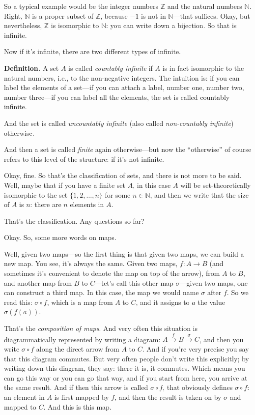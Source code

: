 So a typical example would be the integer numbers $\mathbb{Z}$ and the natural numbers $\mathbb{N}$. Right, $\mathbb{N}$ is a proper subset of $\mathbb{Z}$, because $-1$ is not in $\mathbb{N}$---that suffices. Okay, but nevertheless, $\mathbb{Z}$ is isomorphic to $\mathbb{N}$: you can write down a bijection. So that is infinite.

Now if it's infinite, there are two different types of infinite.

\textbf{Definition.} A set $A$ is called \emph{countably infinite} if $A$ is in fact isomorphic to the natural numbers, i.e., to the non-negative integers. The intuition is: if you can label the elements of a set---if you can attach a label, number one, number two, number three---if you can label all the elements, the set is called countably infinite.

And the set is called \emph{uncountably infinite} (also called \emph{non-countably infinite}) otherwise.

And then a set is called \emph{finite} again otherwise---but now the ``otherwise'' of course refers to this level of the structure: if it's not infinite.

Okay, fine. So that's the classification of sets, and there is not more to be said. Well, maybe that if you have a finite set $A$, in this case $A$ will be set-theoretically isomorphic to the set $\{1, 2, \ldots, n\}$ for some $n \in \mathbb{N}$, and then we write that the size of $A$ is $n$: there are $n$ elements in $A$.

That's the classification. Any questions so far?

Okay. So, some more words on maps.

Well, given two maps---so the first thing is that given two maps, we can build a new map. You see, it's always the same. Given two maps, $f : A \to B$ (and sometimes it's convenient to denote the map on top of the arrow), from $A$ to $B$, and another map from $B$ to $C$---let's call this other map $\sigma$---given two maps, one can construct a third map. In this case, the map we would name $\sigma$ after $f$. So we read this: $\sigma \circ f$, which is a map from $A$ to $C$, and it assigns to $a$ the value $\sigma(f(a))$.

That's the \emph{composition of maps}. And very often this situation is diagrammatically represented by writing a diagram: $A \xrightarrow{f} B \xrightarrow{\sigma} C$, and then you write $\sigma \circ f$ along the direct arrow from $A$ to $C$. And if you're very precise you say that this diagram commutes. But very often people don't write this explicitly; by writing down this diagram, they say: there it is, it commutes. Which means you can go this way or you can go that way, and if you start from here, you arrive at the same result. And if then this arrow is called $\sigma \circ f$, that obviously defines $\sigma \circ f$: an element in $A$ is first mapped by $f$, and then the result is taken on by $\sigma$ and mapped to $C$. And this is this map.

